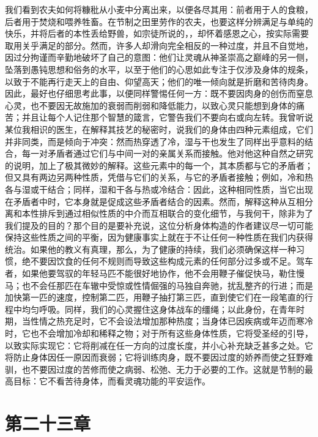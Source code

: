 我们看到农夫如何将糠秕从小麦中分离出来，以便各尽其用：前者用于人的食粮，后者用于焚烧和喂养牲畜。在节制之田里劳作的农夫，也要这样分辨满足与单纯的快乐，并将后者的本性丢给野兽，如宗徒所说的，，却怀着感恩之心，按实际需要取用关乎满足的部分。然而，许多人却滑向完全相反的一种过度，并且不自觉地，因过分拘谨而辛勤地破坏了自己的意图：他们让灵魂从神圣崇高之巅峰的另一侧，坠落到愚钝思想和俗务的水平，以至于他们的心思如此专注于仅涉及身体的规条，以致于不能再行走天上的自由、仰望高天；他们的唯一倾向就是折磨和苦待肉身。因此，最好也仔细思考此事，以便同样警惕任何一方：既不要因肉身的创伤而窒息心灵，也不要因无故施加的衰弱而削弱和降低能力，以致心灵只能想到身体的痛苦；并且让每个人记住那个智慧的箴言，它警告我们不要向右或向左转。我曾听说某位我相识的医生，在解释其技艺的秘密时，说我们的身体由四种元素组成，它们并非同类，而是倾向于冲突：然而热穿透了冷，湿与干也发生了同样出乎意料的结合，每一对矛盾者通过它们与中间一对的亲属关系而接触。他对他这种自然之研究的说明，加上了极其微妙的解释。这些元素中的每一个，其本质都与它的矛盾者；但又具有两边另两种性质，凭借与它们的关系，与它的矛盾者接触；例如，冷和热各与湿或干结合；同样，湿和干各与热或冷结合：因此，这种相同性质，当它出现在矛盾者中时，它本身就是促成这些矛盾者结合的因素。然而，解释这种从互相分离和本性排斥到通过相似性质的中介而互相联合的变化细节，与我何干，除非为了我们提及的目的？那个目的是要补充说，这位分析身体构造的作者建议尽一切可能保持这些性质之间的平衡，因为健康事实上就在于不让任何一种性质在我们内获得统治。如果他的教义有真理，那么，为了健康的持续，我们必须确保这样一种习惯，绝不要因饮食的任何不规则而导致这些构成元素的任何部分过多或不足。驾车者，如果他要驾驭的年轻马匹不能很好地协作，他不会用鞭子催促快马，勒住慢马；也不会任那匹在车辙中受惊或性情倔强的马独自奔驰，扰乱整齐的行进；而是加快第一匹的速度，控制第二匹，用鞭子抽打第三匹，直到使它们在一段笔直的行程中均匀呼吸。同样，我们的心灵握住这身体战车的缰绳；以此身份，在青年时期，当性情之热充足时，它不会设法增加那种热度；当身体已因疾病或年迈而寒冷时，它也不会增加冷却和稀释之物；对于所有这些身体性质，它将受圣经的引导，以致实际实现它：它将削减在任一方向的过度长度，并小心补充缺乏甚多之处。它将防止身体因任一原因而衰弱；它将训练肉身，既不要因过度的娇养而使之狂野难驯，也不要因过度的苦修而使之病弱、松弛、无力于必要的工作。这就是节制的最高目标：它不看苦待身体，而看灵魂功能的平安运作。\par


\section{第二十三章}

